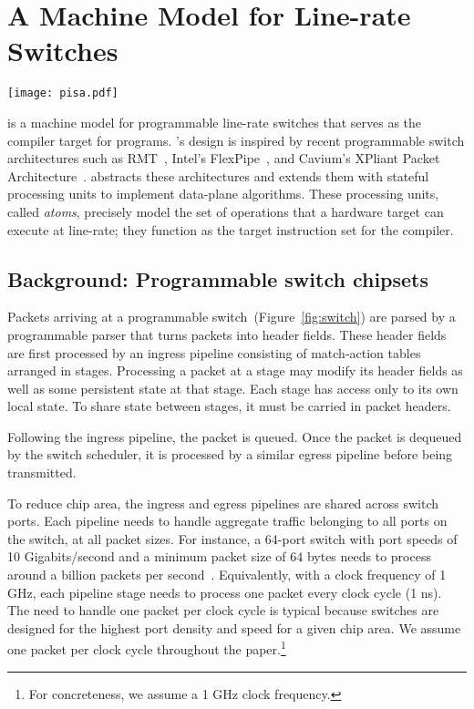 \section{A Machine Model for Line-rate Switches}
\label{s:absmachine}

\begin{figure*}[!t]
  \texttt{[image: pisa.pdf]}
  \caption{The \absmachine machine model and its relationship to
  programmable switch architectures.}
  \label{fig:switch}
\end{figure*}

\absmachine is a machine model for programmable line-rate switches
that serves as the compiler target for \pktlanguage programs.
\absmachine's design is inspired by recent programmable switch
architectures such as RMT~\cite{rmt}, Intel's
FlexPipe~\cite{flexpipe}, and Cavium's XPliant Packet
Architecture~\cite{xpliant}. \absmachine abstracts these architectures
and extends them with stateful processing units to implement
data-plane algorithms. These processing units, called {\em atoms},
precisely model the set of operations that a hardware target can
execute at line-rate; they function as the target instruction set for
the \pktlanguage compiler.

\subsection{Background: Programmable switch chipsets}
Packets arriving at a programmable switch~(Figure~\ref{fig:switch})
are parsed by a programmable parser that turns packets into header
fields. These header fields are first processed by an ingress pipeline
consisting of match-action tables arranged in stages. Processing a
packet at a stage may modify its header fields as well as some
persistent state at that stage. Each stage has access only to its own
local state. To share state between stages, it must be carried in
packet headers.

Following the ingress pipeline, the packet is queued. Once the packet
is dequeued by the switch scheduler, it is processed by a similar
egress pipeline before being transmitted.

To reduce chip area, the ingress and egress pipelines are shared
across switch ports.  Each pipeline needs to handle aggregate traffic
belonging to all ports on the switch, at all packet sizes.  For
instance, a 64-port switch with port speeds of 10 Gigabits/second and
a minimum packet size of 64 bytes needs to process around a billion
packets per second~\cite{rmt}.  Equivalently, with a clock frequency
of 1 GHz, each pipeline stage needs to process one packet every clock
cycle (1 ns).  The need to handle one packet per clock cycle is
typical because switches are designed for the highest port density and
speed for a given chip area. We assume one packet per clock
cycle throughout the paper.\footnote{For concreteness, we assume a 1
  GHz clock frequency.}

